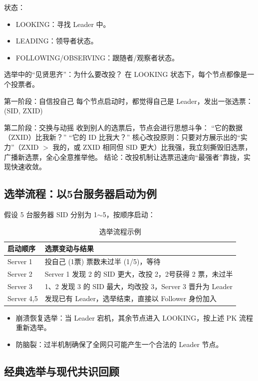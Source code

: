 状态：
\begin{itemize}
\item LOOKING：寻找 Leader 中。
\item LEADING：领导者状态。
\item FOLLOWING/OBSERVING：跟随者/观察者状态。
\end{itemize}

选举中的“见贤思齐”：为什么要改投？
在 LOOKING 状态下，每个节点都像是一个投票者。

第一阶段：自信投自己
每个节点启动时，都觉得自己是 Leader，发出一张选票：(SID, ZXID)

第二阶段：交换与动摇
收到别人的选票后，节点会进行思想斗争：
“它的数据（ZXID）比我新？”
“它的 ID 比我大？”
核心改投原则：只要对方展示出的“实力”（ZXID $>$ 我的，或 ZXID 相同但 SID 更大）比我强，我立刻撕毁旧选票，广播新选票，全心全意推举他。
结论：改投机制让选票迅速向“最强者”靠拢，实现快速收敛。

\subsection{选举流程：以5台服务器启动为例}

假设 5 台服务器 SID 分别为 1$\sim$5，按顺序启动：

\begin{table}[htbp]
\centering
\begin{tabular}{@{}ll@{}}
\toprule
启动顺序 & 选票变动与结果 \\
\midrule
Server 1 & 投自己 (1票) 票数未过半 (1/5)，等待 \\
Server 2 & Server 1 发现 2 的 SID 更大，改投 2，2号获得 2 票，未过半 \\
Server 3 & 1、2 发现 3 的 SID 最大，均改投 3，Server 3 晋升为 Leader \\
Server 4,5 & 发现已有 Leader，选举结束，直接以 Follower 身份加入 \\
\bottomrule
\end{tabular}
\caption{选举流程示例}
\label{tab:election}
\end{table}

\begin{itemize}
\item 崩溃恢复选举：当 Leader 宕机，其余节点进入 LOOKING，按上述 PK 流程重新选举。
\item 防脑裂：过半机制确保了全网只可能产生一个合法的 Leader 节点。
\end{itemize}

\subsection{经典选举与现代共识回顾}


